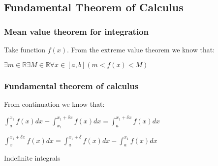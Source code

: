
\subsection{Fundamental Theorem of Calculus}

\subsubsection{Mean value theorem for integration}

Take function \(f(x)\). From the extreme value theorem we know that:

$\exists m \in \mathbb{R} \exists M\in \mathbb{R}\forall x\in [a,b](m<f(x)<M)$

\subsubsection{Fundamental theorem of calculus}

From continuation we know that:

$\int_a^{x_1}f(x)dx+\int_{x_1}^{x_1+\delta x}f(x)dx=\int_a^{x_1+\delta x}f(x)dx$

$\int_x^{x_1+\delta x}f(x)dx=\int_a^{x_1+\delta }f(x)dx-\int_a^{x_1 }f(x)dx$

Indefinite integrals

